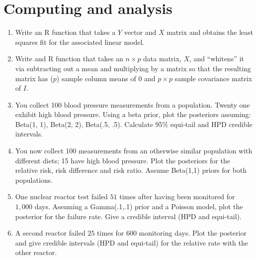 \documentclass[12pt]{article}
\begin{document}
\section{Computing and analysis}
\begin{enumerate}[1.]
\item Write an R function that takes a $Y$ vector and $X$ matrix and obtains
the least squares fit for the associated linear model.
\item Write and R function that takes an $n\times p$ data matrix, $X$, and
	``whitens'' it via subtracting out a mean and multiplying by a matrix
	so that the resulting matrix has ($p$) sample column means of 0 and
	$p\times p$ sample covariance matrix of $I$.
\item You collect 100 blood pressure measurements from a population. Twenty one exhibit high blood pressure. 
  Using a beta prior, plot the posteriors assuming: Beta(1, 1), Beta(2, 2), Beta(.5, .5). Calculate 95\% 
  equi-tail and HPD credible intervals.
\item You now collect 100 measurements from an otherwise similar population with different diets; 15 have high blood pressure.
  Plot the posteriors for the relative risk, risk difference and risk ratio.  Assume Beta(1,1) priors for both populations.
\item One nuclear reactor test failed $51$ times after having been monitored for $1,000$ days. Assuming a Gamma(.1,.1) prior
and a Poisson model, plot the posterior for the failure rate. Give a credible interval (HPD and equi-tail). 
\item A second reactor failed $25$ times for $600$ monitoring
  days. Plot the posterior and give credible intervals (HPD and equi-tail) for the
  relative rate with the other reactor.
\end{enumerate}
\end{document}
